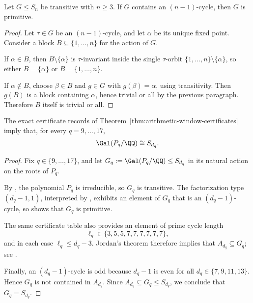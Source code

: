 \begin{lemma}
\label{lem:nminus1-cycle-primitive}
Let \(G\le S_n\) be transitive with \(n\ge 3\).  If \(G\) contains an
\((n-1)\)-cycle, then \(G\) is primitive.
\end{lemma}

\begin{proof}
Let \(\tau\in G\) be an \((n-1)\)-cycle, and let \(\alpha\) be its unique fixed
point.  Consider a block \(B\subseteq\{1,\dots,n\}\) for the action of \(G\).

If \(\alpha\in B\), then \(B\setminus\{\alpha\}\) is \(\tau\)-invariant inside the
single \(\tau\)-orbit \(\{1,\dots,n\}\setminus\{\alpha\}\), so either
\(B=\{\alpha\}\) or \(B=\{1,\dots,n\}\).

If \(\alpha\notin B\), choose \(\beta\in B\) and \(g\in G\) with \(g(\beta)=\alpha\),
using transitivity.  Then \(g(B)\) is a block containing \(\alpha\), hence
trivial or all by the previous paragraph.  Therefore \(B\) itself is trivial or
all.
\end{proof}

\begin{theorem}
\label{thm:galois-sd-window}
The exact certificate records of
Theorem~\ref{thm:arithmetic-window-certificates} imply that, for every
\(q=9,\dots,17\),
\[
  \Gal(P_q/\QQ)\cong S_{d_q}.
\]
\end{theorem}

\begin{proof}
Fix \(q\in\{9,\dots,17\}\), and let \(G_q:=\Gal(P_q/\QQ)\le S_{d_q}\) in its
natural action on the roots of \(P_q\).

By , the polynomial \(P_q\) is irreducible, so
\(G_q\) is transitive.  The factorization type \((d_q-1,1)\), interpreted by
, exhibits an element of \(G_q\)
that is an \((d_q-1)\)-cycle, so  shows that
\(G_q\) is primitive.

The same certificate table also provides an element of prime cycle length
\[
  \ell_q\in\{3,5,5,7,7,7,7,7,7\},
\]
and in each case \(\ell_q\le d_q-3\).  Jordan's theorem therefore implies that
\(A_{d_q}\subseteq G_q\); see \cite[Thm.~3.3A]{DixonMortimer1996}.

Finally, an \((d_q-1)\)-cycle is odd because \(d_q-1\) is even for all
\(d_q\in\{7,9,11,13\}\).  Hence \(G_q\) is not contained in \(A_{d_q}\).  Since
\(A_{d_q}\subseteq G_q\le S_{d_q}\), we conclude that \(G_q=S_{d_q}\).
\end{proof}

